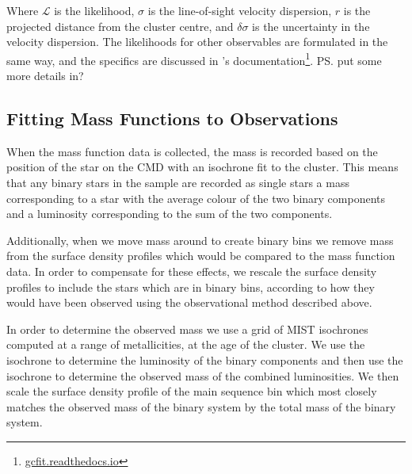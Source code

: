 Where $\mathcal{L}$ is the likelihood, $\sigma$ is the line-of-sight velocity dispersion, $r$ is the
projected distance from the cluster centre, and $\delta \sigma$ is the uncertainty in the velocity
dispersion. The likelihoods for other observables are formulated in the same way, and the specifics
are discussed in 's documentation\footnote{\url{gcfit.readthedocs.io}}.
\ps{put some more details in?}




\subsection{Fitting Mass Functions to Observations}

When the mass function data is collected, the mass is recorded based on the position of the star on
the CMD with an isochrone fit to the cluster. This means that any binary stars in the sample are
recorded as single stars a mass corresponding to a star with the average colour of the two binary
components and a luminosity corresponding to the sum of the two components.

Additionally, when we move mass around to create binary bins we remove mass from the surface density
profiles which would be compared to the mass function data. In order to compensate for these
effects, we rescale the surface density profiles to include the stars which are in binary bins,
according to how they would have been observed using the observational method described above.

In order to determine the observed mass we use a grid of MIST isochrones computed at a range of
metallicities, at the age of the cluster. We use the isochrone to determine the luminosity of the
binary components and then use the isochrone to determine the observed mass of the combined
luminosities. We then scale the surface density profile of the main sequence bin which most closely
matches the observed mass of the binary system by the total mass of the binary system. 